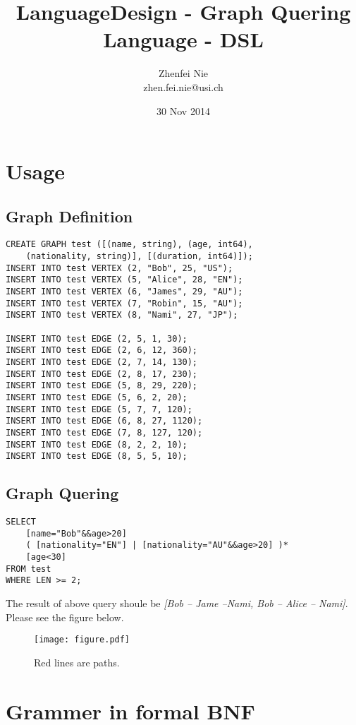 \documentclass{article}
\title{LanguageDesign - Graph Quering Language - DSL}   %
\author {Zhenfei Nie \\zhen.fei.nie@usi.ch}  %
\date{30 Nov 2014}    %
\begin{document}
 


\maketitle 

\section{Usage}

\subsection{Graph Definition}
\begin{lstlisting}
CREATE GRAPH test ([(name, string), (age, int64), 
	(nationality, string)], [(duration, int64)]);
INSERT INTO test VERTEX (2, "Bob", 25, "US");
INSERT INTO test VERTEX (5, "Alice", 28, "EN");
INSERT INTO test VERTEX (6, "James", 29, "AU");
INSERT INTO test VERTEX (7, "Robin", 15, "AU");
INSERT INTO test VERTEX (8, "Nami", 27, "JP");

INSERT INTO test EDGE (2, 5, 1, 30);
INSERT INTO test EDGE (2, 6, 12, 360);
INSERT INTO test EDGE (2, 7, 14, 130);
INSERT INTO test EDGE (2, 8, 17, 230);
INSERT INTO test EDGE (5, 8, 29, 220);
INSERT INTO test EDGE (5, 6, 2, 20);
INSERT INTO test EDGE (5, 7, 7, 120);
INSERT INTO test EDGE (6, 8, 27, 1120);
INSERT INTO test EDGE (7, 8, 127, 120);
INSERT INTO test EDGE (8, 2, 2, 10);
INSERT INTO test EDGE (8, 5, 5, 10);
\end{lstlisting}
\pagebreak
\subsection{Graph Quering}
\begin{lstlisting}
SELECT
	[name="Bob"&&age>20] 
	( [nationality="EN"] | [nationality="AU"&&age>20] )*
	[age<30] 
FROM test 
WHERE LEN >= 2;
\end{lstlisting}
The result of above query shoule be \textit{[Bob -- Jame --Nami, Bob -- Alice -- Nami]}. Please see the figure below.

\begin{figure}[h]
\centering
\texttt{[image: figure.pdf]}
\caption{Red lines are paths.}
\end{figure}


\pagebreak
\section{Grammer in formal BNF}
\end{document}
